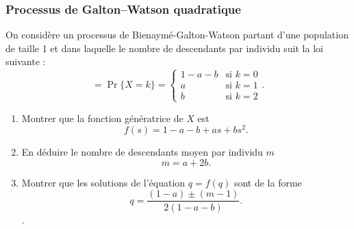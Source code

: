 \subsubsection{Processus de Galton–Watson quadratique \todo{}} %
  On considère un processus de Bienaymé-Galton-Watson partant d'une population de taille 1 et dans laquelle le nombre de descendants par individu suit la loi suivante :
  $$=
  \Pr\{X = k\} = \left\{
    \begin{array}{ll}
      1 - a - b & \text{si $k = 0$} \\
      a & \text{si $k = 1$} \\
      b & \text{si $k = 2$}
    \end{array}\right..
  $$
  \begin{enumerate}
    \item Montrer que la fonction génératrice de $X$ est
    $$
    f(s) = 1 - a - b + as + bs^2.
    $$
    \solution{\todo{}}
    \item En déduire le nombre de descendants moyen par individu $m$
    $$
    m = a + 2b.
    $$
    \item Montrer que les solutions de l'équation $q = f(q)$ sont de la forme
    $$
    q = \frac{(1-a) \pm (m-1)}{2(1 - a - b)}.
    $$
    .
  \end{enumerate}
